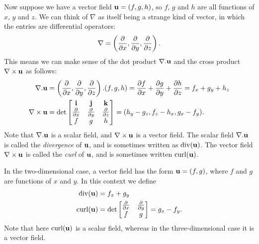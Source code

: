 \documentclass[reqno]{amsart}
\theoremstyle{definition}
\begin{document}
Now suppose we have a vector field $\mathbf{u}=(f,g,h)$, so $f$, $g$ and $h$
are all functions of $x$, $y$ and $z$.  We can think of $\nabla$ as
itself being a strange kind of vector, in which the entries are
differential operators:
\[ \nabla =
    \left(\frac{\partial}{\partial x},
          \frac{\partial}{\partial y},
          \frac{\partial}{\partial z}\right).
\]
This means we can make sense of the dot product $\nabla.\mathbf{u}$ and the
cross product $\nabla\times\mathbf{u}$ as follows:
\begin{align*}
 \nabla.\mathbf{u} &= 
    \left(\frac{\partial}{\partial x},
          \frac{\partial}{\partial y},
          \frac{\partial}{\partial z}\right).
    (f,g,h) = 
    \frac{\partial f}{\partial x} + 
    \frac{\partial g}{\partial y} + 
    \frac{\partial h}{\partial z} = 
     f_x+g_y+h_z \\
 \nabla\times\mathbf{u} &= 
  \det\left[\begin{matrix} \mathbf{i} & \mathbf{j} & \mathbf{k} \\
           \frac{\partial}{\partial x} &
           \frac{\partial}{\partial y} &
           \frac{\partial}{\partial z} \\
           f & g & h \end{matrix}\right] = 
   (h_y-g_z,f_z-h_x,g_x-f_y). 
\end{align*}
Note that $\nabla.\mathbf{u}$ is a scalar field, and $\nabla\times\mathbf{u}$ is a
vector field.  The scalar field $\nabla.\mathbf{u}$ is called the
\emph{divergence} of $\mathbf{u}$, and is sometimes written as $\operatorname{div}(\mathbf{u})$.
The vector field $\nabla\times\mathbf{u}$ is called the \emph{curl} of $\mathbf{u}$,
and is sometimes written $\operatorname{curl}(\mathbf{u})$.

In the two-dimensional case, a vector field has the form $\mathbf{u}=(f,g)$,
where $f$ and $g$ are functions of $x$ and $y$.  In this context we
define 
\begin{align*}
 \operatorname{div}(\mathbf{u})   &= f_x+g_y \\
 \operatorname{curl}(\mathbf{u}) &=
   \det\left[\begin{matrix}
    \frac{\partial}{\partial x} & \frac{\partial}{\partial y} \\
    f & g \end{matrix}\right] = g_x-f_y.
\end{align*}
Note that here $\operatorname{curl}(\mathbf{u})$ is a scalar field, whereas in the
three-dimensional case it is a vector field.
\end{document}
